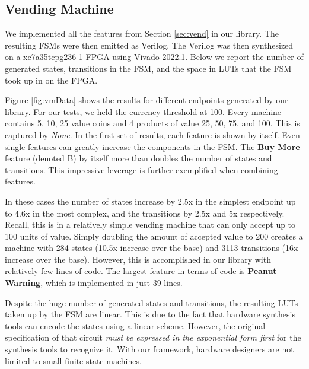 \documentclass[sigplan,anonymous,review]{acmart}
\begin{document}
\subsection{Vending Machine}
We implemented all the features from Section \ref{sec:vend} in our library. The resulting FSMs were then emitted as Verilog. The Verilog was then synthesized on a xc7a35tcpg236-1 FPGA using Vivado 2022.1. Below we report the number of generated states, transitions in the FSM, and the space in LUTs that the FSM took up in on the FPGA.

Figure \ref{fig:vmData} shows the results for different endpoints generated by our library. For our tests, we held the currency threshold at 100. Every machine contains 5, 10, 25 value coins and 4 products of value 25, 50, 75, and 100. This is captured by \textit{None}. In the first set of results, each feature is shown by itself. Even single features can greatly increase the components in the FSM. The \textbf{Buy More} feature (denoted B) by itself more than doubles the number of states and transitions. This impressive leverage is further exemplified when combining features. 

In these cases the number of states increase by 2.5x in the simplest endpoint up to 4.6x in the most complex, and the transitions by 2.5x and 5x respectively. Recall, this is in a relatively simple vending machine that can only accept up to 100 units of value. Simply doubling the amount of accepted value to 200 creates a machine with 284 states (10.5x increase over the base) and 3113 transitions (16x increase over the base). However, this is accomplished in our library with relatively few lines of code. The largest feature in terms of code is \textbf{Peanut Warning}, which is implemented in just 39 lines. 

Despite the huge number of generated states and transitions, the resulting LUTs taken up by the FSM are linear. This is due to the fact that hardware synthesis tools can encode the states using a linear scheme. However, the original specification of that circuit \textit{must be expressed in the exponential form first} for the synthesis tools to recognize it. With our framework, hardware designers are not limited to small finite state machines.
\end{document}
